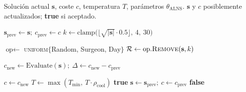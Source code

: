 \begin{algorithm}[H]
\caption{\textsc{ALNS.Apply} — Iteración destroy + repair con aceptación SA.}
\label{alg:alns-apply}
\begin{algorithmic}[1]
\Require Solución actual $\mathbf{s}$, coste $c$, temperatura $T$, parámetros $\theta_{\text{ALNS}}$.
\Ensure $\mathbf{s}$ y $c$ posiblemente actualizados; \textbf{true} si aceptado.

\State $\mathbf{s}_{\text{prev}} \gets \mathbf{s};\ c_{\text{prev}} \gets c$
\State $k \gets \mathrm{clamp}\!\bigl(\lfloor\sqrt{|\mathbf{s}|}\cdot 0.5\rfloor,\ 4,\ 30\bigr)$

\State $\text{op} \gets$ \textsc{uniform}$\{$Random, Surgeon, Day$\}$
\State $\mathcal{R} \gets \text{op}.\textsc{Remove}(\mathbf{s}, k)$

\State {}
\State {}
\State $c_{\text{new}} \gets \text{Evaluate}(\mathbf{s});\ \Delta \gets c_{\text{new}} - c_{\text{prev}}$

   \State $c \gets c_{\text{new}}$
   \State $T \gets \max(T_{\min},\ T \cdot \rho_{\text{cool}})$ 
   \State \Return \textbf{true}
\Else
   \State $\mathbf{s} \gets \mathbf{s}_{\text{prev}};\ c \gets c_{\text{prev}}$
   \State \Return \textbf{false}
\EndIf
\end{algorithmic}
\end{algorithm}


